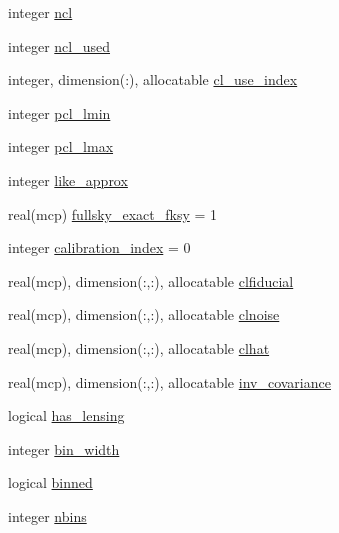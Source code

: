 \begin{DoxyCompactItemize}
\item 
integer \mbox{\hyperlink{structcmblikes_1_1tcmblikes_a58f515d36f9ed1f092de521ae441a2d4}{ncl}}
\item 
integer \mbox{\hyperlink{structcmblikes_1_1tcmblikes_a0e93fdda44c9f4be5a47b51ca610d190}{ncl\+\_\+used}}
\item 
integer, dimension(\+:), allocatable \mbox{\hyperlink{structcmblikes_1_1tcmblikes_ab2e66e29d79a9a00d1fb99b0ec7182e3}{cl\+\_\+use\+\_\+index}}
\item 
integer \mbox{\hyperlink{structcmblikes_1_1tcmblikes_a6a58c887359fb517353b18e7feb32463}{pcl\+\_\+lmin}}
\item 
integer \mbox{\hyperlink{structcmblikes_1_1tcmblikes_ad5c6296000760f1980309a729d453ce3}{pcl\+\_\+lmax}}
\item 
integer \mbox{\hyperlink{structcmblikes_1_1tcmblikes_a3e54a5142cfd8d567a68bc1cef18d8c9}{like\+\_\+approx}}
\item 
real(mcp) \mbox{\hyperlink{structcmblikes_1_1tcmblikes_a1185947112760be23b53129ebc6f450b}{fullsky\+\_\+exact\+\_\+fksy}} = 1
\item 
integer \mbox{\hyperlink{structcmblikes_1_1tcmblikes_ad258fdc118c2b64d63e2b417a2c70298}{calibration\+\_\+index}} = 0
\item 
real(mcp), dimension(\+:,\+:), allocatable \mbox{\hyperlink{structcmblikes_1_1tcmblikes_a06ff56cc6d6b8c69cb1ae54bdb4e1d9d}{clfiducial}}
\item 
real(mcp), dimension(\+:,\+:), allocatable \mbox{\hyperlink{structcmblikes_1_1tcmblikes_a155250234c34332b4951824c96bfe7a9}{clnoise}}
\item 
real(mcp), dimension(\+:,\+:), allocatable \mbox{\hyperlink{structcmblikes_1_1tcmblikes_a85d6e46d61b0931d628b05667ac33b63}{clhat}}
\item 
real(mcp), dimension(\+:,\+:), allocatable \mbox{\hyperlink{structcmblikes_1_1tcmblikes_a449afd09c5b8abbe3cefc80cab3d5eb7}{inv\+\_\+covariance}}
\item 
logical \mbox{\hyperlink{structcmblikes_1_1tcmblikes_ae2b221916605165edf4f75674ca7deb6}{has\+\_\+lensing}}
\item 
integer \mbox{\hyperlink{structcmblikes_1_1tcmblikes_aed56895c13062bc882d5560832c7710b}{bin\+\_\+width}}
\item 
logical \mbox{\hyperlink{structcmblikes_1_1tcmblikes_a52638e217880bc4d7a544e2a6fd89a5a}{binned}}
\item 
integer \mbox{\hyperlink{structcmblikes_1_1tcmblikes_ac8bb18afd81dc182bb0da240921ab9d9}{nbins}}
\item 

\end{DoxyCompactItemize}
